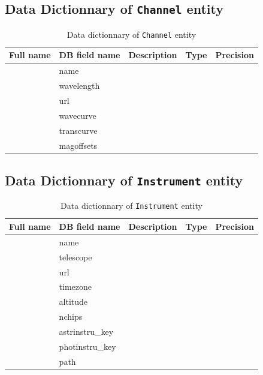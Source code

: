 \documentclass[twoside,a4paper]{article}
\begin{document}
\subsection{Data Dictionnary of {\tt Channel} entity}
\begin{table}[h]
\centering
\footnotesize{
\begin{tabular}{|l|l|l|l|l|}
\hline
Full name & DB field name & Description & Type & Precision\\
\hline
& name&&&\\
& wavelength&&&\\
& url&&&\\
& wavecurve&&&\\
& transcurve&&&\\
& magoffsets&&&\\
\hline
\end{tabular}}
\caption{Data dictionnary of {\tt Channel} entity}
\end{table}

\subsection{Data Dictionnary of {\tt Instrument} entity}
\begin{table}[h]
\centering
\footnotesize{
\begin{tabular}{|l|l|l|l|l|}
\hline
Full name & DB field name & Description & Type & Precision\\
\hline
& name&&&\\
& telescope&&&\\
& url&&&\\
& timezone&&&\\
& altitude&&&\\
& nchips&&&\\
& astrinstru\_key&&&\\
& photinstru\_key&&&\\
& path          &&&\\
\hline
\end{tabular}}
\caption{Data dictionnary of {\tt Instrument} entity}
\end{table}
\end{document}
